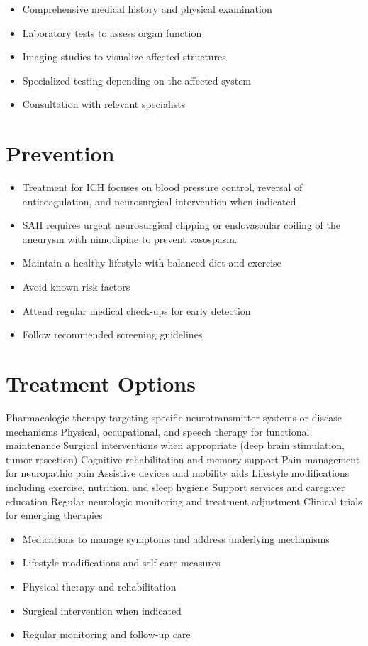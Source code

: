 \begin{itemize}[noitemsep]
  \item Comprehensive medical history and physical examination
  \item Laboratory tests to assess organ function
  \item Imaging studies to visualize affected structures
  \item Specialized testing depending on the affected system
  \item Consultation with relevant specialists
\end{itemize}
\section{Prevention}
\begin{itemize}[noitemsep]
  \item Treatment for ICH focuses on blood pressure control, reversal of anticoagulation, and neurosurgical intervention when indicated
  \item SAH requires urgent neurosurgical clipping or endovascular coiling of the aneurysm with nimodipine to prevent vasospasm.
  \item Maintain a healthy lifestyle with balanced diet and exercise
  \item Avoid known risk factors
  \item Attend regular medical check-ups for early detection
  \item Follow recommended screening guidelines
\end{itemize}
\section{Treatment Options}
Pharmacologic therapy targeting specific neurotransmitter systems or disease mechanisms Physical, occupational, and speech therapy for functional maintenance Surgical interventions when appropriate (deep brain stimulation, tumor resection) Cognitive rehabilitation and memory support Pain management for neuropathic pain Assistive devices and mobility aids Lifestyle modifications including exercise, nutrition, and sleep hygiene Support services and caregiver education Regular neurologic monitoring and treatment adjustment Clinical trials for emerging therapies

\begin{itemize}[noitemsep]
  \item Medications to manage symptoms and address underlying mechanisms
  \item Lifestyle modifications and self-care measures
  \item Physical therapy and rehabilitation
  \item Surgical intervention when indicated
  \item Regular monitoring and follow-up care
\end{itemize}
